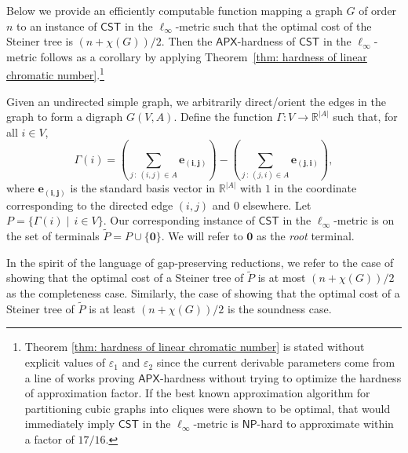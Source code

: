 \documentclass{theoretics}
\newcommand{\R}{\mathbb{R}}
\newcommand{\1}{\textbf{1}}
\newcommand{\cst}{$\mathsf{CST}$\xspace}
\newcommand{\np}{$\mathsf{NP}$\xspace}
\newcommand{\apx}{$\mathsf{APX}$\xspace}
\renewcommand{\tilde}{\widetilde}
\begin{document}
Below we provide an  efficiently computable function mapping a graph $G$ of order $n$ to an instance of \cst in the $\ell_{\infty}$-metric such that the optimal cost of the Steiner tree is $(n + \chi(G))/2$. Then the \apx-hardness of \cst in the $\ell_{\infty}$-metric follows as a corollary by applying Theorem~\ref{thm: hardness of linear chromatic number}.\footnote{Theorem \ref{thm: hardness of linear chromatic number} is stated without explicit values of $\varepsilon_1$ and $\varepsilon_2$ since the current derivable parameters come from a line of works proving \apx-hardness without trying to optimize the hardness of approximation factor. If the best known approximation algorithm for partitioning cubic graphs into cliques were shown to be optimal, that would immediately imply \cst in the $\ell_{\infty}$-metric is \np-hard to approximate within a factor of $17/16$.}


Given an undirected simple graph, we arbitrarily direct/orient the edges in the graph to form a digraph $G(V, A)$. Define the function $\Gamma: V \to \R^{|A|}$ such that, for all $i \in V$,
\[
\Gamma(i) = \left(\sum_{j \,:\, (i,j) \in A}\mathbf{e_{(i,j)}}\right) -\left( \sum_{j \,:\, (j,i)\in A}\mathbf{e_{(j,i)}}\right),
\]
where $\mathbf{e_{(i,j)}}$ is the standard basis vector in $\R^{|A|}$ with $1$ in the coordinate corresponding to the directed edge $(i,j)$ and $0$ elsewhere. Let $P = \{\Gamma(i) \mid\, i \in V\}$. Our corresponding instance of \cst in the $\ell_{\infty}$-metric is on the set of terminals $\tilde{P} =  P \cup \{\mathbf{0}\}$. We will refer to $\mathbf{0}$ as the \textit{root} terminal. 

In the spirit of the language of gap-preserving reductions, we refer to the case of showing that the optimal cost of a Steiner tree of $\tilde{P}$ is at most $(n + \chi(G))/2$ as the completeness case. Similarly, the case of showing that the optimal cost of a Steiner tree of $\tilde{P}$ is at least $(n + \chi(G))/2$ is the soundness case.
\end{document}
